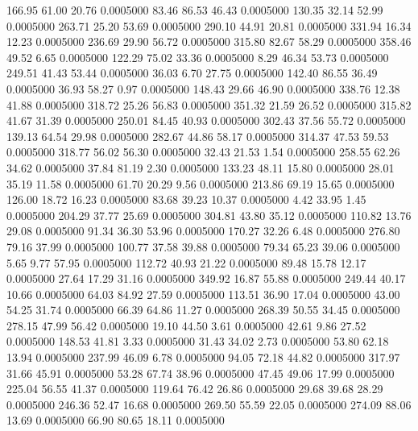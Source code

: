  166.95   61.00   20.76   0.0005000
  83.46   86.53   46.43   0.0005000
 130.35   32.14   52.99   0.0005000
 263.71   25.20   53.69   0.0005000
 290.10   44.91   20.81   0.0005000
 331.94   16.34   12.23   0.0005000
 236.69   29.90   56.72   0.0005000
 315.80   82.67   58.29   0.0005000
 358.46   49.52    6.65   0.0005000
 122.29   75.02   33.36   0.0005000
   8.29   46.34   53.73   0.0005000
 249.51   41.43   53.44   0.0005000
  36.03    6.70   27.75   0.0005000
 142.40   86.55   36.49   0.0005000
  36.93   58.27    0.97   0.0005000
 148.43   29.66   46.90   0.0005000
 338.76   12.38   41.88   0.0005000
 318.72   25.26   56.83   0.0005000
 351.32   21.59   26.52   0.0005000
 315.82   41.67   31.39   0.0005000
 250.01   84.45   40.93   0.0005000
 302.43   37.56   55.72   0.0005000
 139.13   64.54   29.98   0.0005000
 282.67   44.86   58.17   0.0005000
 314.37   47.53   59.53   0.0005000
 318.77   56.02   56.30   0.0005000
  32.43   21.53    1.54   0.0005000
 258.55   62.26   34.62   0.0005000
  37.84   81.19    2.30   0.0005000
 133.23   48.11   15.80   0.0005000
  28.01   35.19   11.58   0.0005000
  61.70   20.29    9.56   0.0005000
 213.86   69.19   15.65   0.0005000
 126.00   18.72   16.23   0.0005000
  83.68   39.23   10.37   0.0005000
   4.42   33.95    1.45   0.0005000
 204.29   37.77   25.69   0.0005000
 304.81   43.80   35.12   0.0005000
 110.82   13.76   29.08   0.0005000
  91.34   36.30   53.96   0.0005000
 170.27   32.26    6.48   0.0005000
 276.80   79.16   37.99   0.0005000
 100.77   37.58   39.88   0.0005000
  79.34   65.23   39.06   0.0005000
   5.65    9.77   57.95   0.0005000
 112.72   40.93   21.22   0.0005000
  89.48   15.78   12.17   0.0005000
  27.64   17.29   31.16   0.0005000
 349.92   16.87   55.88   0.0005000
 249.44   40.17   10.66   0.0005000
  64.03   84.92   27.59   0.0005000
 113.51   36.90   17.04   0.0005000
  43.00   54.25   31.74   0.0005000
  66.39   64.86   11.27   0.0005000
 268.39   50.55   34.45   0.0005000
 278.15   47.99   56.42   0.0005000
  19.10   44.50    3.61   0.0005000
  42.61    9.86   27.52   0.0005000
 148.53   41.81    3.33   0.0005000
  31.43   34.02    2.73   0.0005000
  53.80   62.18   13.94   0.0005000
 237.99   46.09    6.78   0.0005000
  94.05   72.18   44.82   0.0005000
 317.97   31.66   45.91   0.0005000
  53.28   67.74   38.96   0.0005000
  47.45   49.06   17.99   0.0005000
 225.04   56.55   41.37   0.0005000
 119.64   76.42   26.86   0.0005000
  29.68   39.68   28.29   0.0005000
 246.36   52.47   16.68   0.0005000
 269.50   55.59   22.05   0.0005000
 274.09   88.06   13.69   0.0005000
  66.90   80.65   18.11   0.0005000
